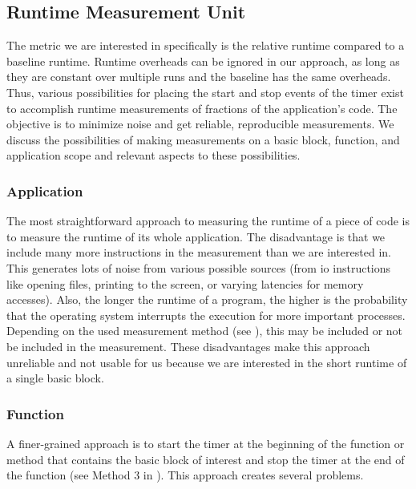 \subsection{Runtime Measurement Unit}
\label{sec:approach:runtime-measurement-unit}
The metric we are interested in specifically is the relative runtime compared to a baseline runtime.
Runtime overheads can be ignored in our approach, as long as they are constant over multiple runs and the baseline has the same overheads.
Thus, various possibilities for placing the start and stop events of the timer exist to accomplish runtime measurements of fractions of the application's code.
The objective is to minimize noise and get reliable, reproducible measurements.
We discuss the possibilities of making measurements on a basic block, function, and application scope and relevant aspects to these possibilities.

\subsubsection{Application}
\label{sec:approach:datageneration:runtime:app}
The most straightforward approach to measuring the runtime of a piece of code is to measure the runtime of its whole application.
The disadvantage is that we include many more instructions in the measurement than we are interested in.
This generates lots of noise from various possible sources (\eg from \ac{io} instructions like opening files, printing to the screen, or varying latencies for memory accesses).
Also, the longer the runtime of a program, the higher is the probability that the operating system interrupts the execution for more important processes.
Depending on the used measurement method (see ), this may be included or not be included in the measurement.
These disadvantages make this approach unreliable and not usable for us because we are interested in the short runtime of a single basic block.

\subsubsection{Function}
\label{sec:approach:datageneration:runtime:function}
A finer-grained approach is to start the timer at the beginning of the function or method that contains the basic block of interest and stop the timer at the end of the function (see Method 3 in ).
This approach creates several problems.

